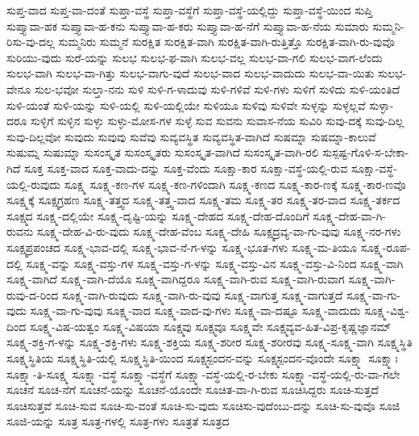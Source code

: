 {ಸುಪ್ತ-ವಾದ
ಸುಪ್ತ-ವಾ-ದಂತೆ
ಸುಪ್ತಾ-ವಸ್ಥೆ
ಸುಪ್ತಾ-ವಸ್ಥೆಗೆ
ಸುಪ್ತಾ-ವಸ್ಥೆ-ಯಲ್ಲಿದ್ದು
ಸುಪ್ತಾ-ವಸ್ಥೆ-ಯಿಂದ
ಸುಪ್ತಿ
ಸುಪ್ತ್ಯಾವಾ-ಹಕ
ಸುಪ್ತ್ಯಾವಾ-ಹ-ಕನು
ಸುಪ್ತ್ಯಾವಾ-ಹ-ಕರು
ಸುಪ್ತ್ಯಾವಾ-ಹ-ನೆಗೆ
ಸುಪ್ತ್ಯಾವಾ-ಹ-ನೆಯ
ಸುಮಾರು
ಸುಮ್ಮನಿ-ರಿಸು-ವು-ದಲ್ಲ
ಸುಮ್ಮನಿರು
ಸುಮ್ಮನೆ
ಸುರಕ್ಷಿತ
ಸುರಕ್ಷಿತ-ವಾಗಿ
ಸುರಕ್ಷಿತ-ವಾಗಿ-ರುತ್ತಿತ್ತೊ
ಸುರಕ್ಷಿತ-ವಾಗಿ-ರು-ವುವೊ
ಸುರಿಯು-ವುದು
ಸುರೆ-ಯನ್ನು
ಸುಲಭ
ಸುಲಭ-ಫ-ವಾಗಿ
ಸುಲಭ-ವಲ್ಲ
ಸುಲಭ-ವಾ-ಗಲಿ
ಸುಲಭ-ವಾಗ-ಲೆಂದು
ಸುಲಭ-ವಾಗಿ
ಸುಲಭ-ವಾ-ಗಿತ್ತು
ಸುಲಭ-ವಾಗು-ವುದೆ
ಸುಲಭ-ವಾದ
ಸುಲಭ-ವಾದುದು
ಸುಲಭ-ವಾ-ಯಿತು
ಸುಲಭ-ವೇನೂ
ಸುಲ-ಭವೋ
ಸುಲ್ತಾ-ನನು
ಸುಳಿ
ಸುಳಿ-ಗ-ಳಾದುವು
ಸುಳಿ-ಗಳಿವೆ
ಸುಳಿ-ಗಳು
ಸುಳಿಗೆ
ಸುಳಿದು
ಸುಳಿ-ಯಂತಿದೆ
ಸುಳಿ-ಯಂತೆ
ಸುಳಿ-ಯನ್ನು
ಸುಳಿ-ಯಲ್ಲಿ
ಸುಳಿ-ಯಲ್ಲಿಯೇ
ಸುಳಿಯೂ
ಸುಳಿವು
ಸುಳಿವೇ
ಸುಳ್ಳನ್ನು
ಸುಳ್ಳಲ್ಲವೆ
ಸುಳ್ಳಾ-ದರೂ
ಸುಳ್ಳಿಗೆ
ಸುಳ್ಳಿನ
ಸುಳ್ಳು
ಸುಳ್ಳು-ಮೋಸ-ಗಳ
ಸುಳ್ಳೆ
ಸುವ
ಸುವನು
ಸುವಾಸ-ನೆಯ
ಸುವಿರಿ
ಸುವು-ದಕ್ಕೆ
ಸುವು-ದಿಲ್ಲ
ಸುವು-ದಿಲ್ಲವೋ
ಸುವುದು
ಸುವುವು
ಸುವೆವು
ಸುವ್ಯವಸ್ಥಿತ
ಸುವ್ಯವಸ್ಥಿತ-ವಾಗಿದೆ
ಸುಷಮ್ನಾ
ಸುಷಮ್ನಾ-ಕಾಲುವೆ
ಸುಷುಮ್ನ
ಸುಷುಮ್ನಾ
ಸುಸಂಸ್ಕೃತ
ಸುಸಂಸ್ಕೃತರು
ಸುಸಂಸ್ಕೃತ-ವಾಗಿದೆ
ಸುಸಂಸ್ಕೃತ-ವಾಗಿ-ರಲಿ
ಸುಸ್ಪಷ್ಟ-ಗೊಳಿ-ಸ-ಬೇಕಾ-ಗಿದೆ
ಸೂಕ್ತ
ಸೂಕ್ತ-ವಾದ
ಸೂಕ್ತ-ವಾದು-ದನ್ನು
ಸೂಕ್ತ-ವೆಂದು
ಸೂಕ್ಷಾ-ಕಾರ
ಸೂಕ್ಷಾ-ವಸ್ಥೆ-ಯಲ್ಲಿ-ರುವ
ಸೂಕ್ಷಾ-ವಸ್ಥೆ-ಯಲ್ಲಿ-ರುವುದು
ಸೂಕ್ಷ್ಮ
ಸೂಕ್ಷ್ಮ-ಕಣ-ಗಳ
ಸೂಕ್ಷ್ಮ-ಕಣ-ಗಳಿಂದಾಗಿ
ಸೂಕ್ಷ್ಮ-ಕಣದ
ಸೂಕ್ಷ್ಮ-ಕಾರ-ಣಕ್ಕೆ
ಸೂಕ್ಷ್ಮ-ಕಾರ-ಣವೊ
ಸೂಕ್ಷ್ಮಕ್ಕೆ
ಸೂಕ್ಷ್ಮಗ್ರಹಣ
ಸೂಕ್ಷ್ಮ-ತತ್ತ್ವದ
ಸೂಕ್ಷ್ಮ-ತತ್ತ್ವ-ವಾದ
ಸೂಕ್ಷ್ಮ-ತಮ
ಸೂಕ್ಷ್ಮ-ತರ
ಸೂಕ್ಷ್ಮ-ತರ-ವಾದ
ಸೂಕ್ಷ್ಮ-ತರ್ಕದ
ಸೂಕ್ಷ್ಮದ
ಸೂಕ್ಷ್ಮ-ದಲ್ಲಿಯೇ
ಸೂಕ್ಷ್ಮ-ದೃಷ್ಟಿ-ಯನ್ನು
ಸೂಕ್ಷ್ಮ-ದೇಹದ
ಸೂಕ್ಷ್ಮ-ದೇಹ-ದೊಂದಿಗೆ
ಸೂಕ್ಷ್ಮ-ದೇಹ-ವಾ-ಗಿ-ರುವನು
ಸೂಕ್ಷ್ಮ-ದೇಹ-ವಿ-ರು-ವುದು
ಸೂಕ್ಷ್ಮ-ದೇಹ-ವೆಂಬ
ಸೂಕ್ಷ್ಮ-ದೇಹಿ
ಸೂಕ್ಷ್ಮದ್ರವ್ಯ-ವಾ-ಗು-ವುವು
ಸೂಕ್ಷ್ಮ-ನರ-ಗಳು
ಸೂಕ್ಷ್ಮಪ್ರಪಂಚದ
ಸೂಕ್ಷ್ಮ-ಭಾವ-ದಲ್ಲಿ
ಸೂಕ್ಷ್ಮ-ಭಾವ-ನೆ-ಗ-ಳನ್ನು
ಸೂಕ್ಷ್ಮ-ಭೂತ-ಗಳು
ಸೂಕ್ಷ್ಮ-ಮ-ತಿಯೂ
ಸೂಕ್ಷ್ಮ-ರೂಪ-ದಲ್ಲಿ
ಸೂಕ್ಷ್ಮ-ವನ್ನು
ಸೂಕ್ಷ್ಮ-ವಸ್ತು-ಗಳ
ಸೂಕ್ಷ್ಮ-ವಸ್ತು-ಗ-ಳನ್ನು
ಸೂಕ್ಷ್ಮ-ವಸ್ತು-ವಿನ
ಸೂಕ್ಷ್ಮ-ವಸ್ತು-ವಿ-ನಿಂದ
ಸೂಕ್ಷ್ಮ-ವಾಗಿ
ಸೂಕ್ಷ್ಮ-ವಾಗಿದೆ
ಸೂಕ್ಷ್ಮ-ವಾಗಿ-ದೆಯೊ
ಸೂಕ್ಷ್ಮ-ವಾಗಿದ್ದರೂ
ಸೂಕ್ಷ್ಮ-ವಾಗಿ-ರುವ
ಸೂಕ್ಷ್ಮ-ವಾಗಿ-ರುವಾಗ
ಸೂಕ್ಷ್ಮ-ವಾಗಿ-ರುವು-ದ-ರಿಂದ
ಸೂಕ್ಷ್ಮ-ವಾಗಿ-ರುವುದು
ಸೂಕ್ಷ್ಮ-ವಾಗಿ-ರು-ವುವು
ಸೂಕ್ಷ್ಮ-ವಾಗುತ್ತ
ಸೂಕ್ಷ್ಮ-ವಾಗುತ್ತದೆ
ಸೂಕ್ಷ್ಮ-ವಾ-ಗು-ವುದು
ಸೂಕ್ಷ್ಮ-ವಾ-ಗು-ವುವು
ಸೂಕ್ಷ್ಮ-ವಾದ
ಸೂಕ್ಷ್ಮ-ವಾದ-ವು-ಗಳು
ಸೂಕ್ಷ್ಮ-ವಾ-ದಷ್ಟೂ
ಸೂಕ್ಷ್ಮ-ವಾದುದು
ಸೂಕ್ಷ್ಮ-ವಿಶ್ವ-ದಿಂದ
ಸೂಕ್ಷ್ಮ-ವಿಷ-ಯತ್ವಂ
ಸೂಕ್ಷ್ಮ-ವಿಷಯಾ
ಸೂಕ್ಷ್ಮವು
ಸೂಕ್ಷ್ಮವೂ
ಸೂಕ್ಷ್ಮವೇ
ಸೂಕ್ಷ್ಮವ್ಯವ-ಹಿತ-ವಿಪ್ರ-ಕೃಷ್ಣಜ್ಞಾನಮ್
ಸೂಕ್ಷ್ಮ-ಶಕ್ತಿ-ಗ-ಳನ್ನು
ಸೂಕ್ಷ್ಮ-ಶಕ್ತಿ-ಗಳು
ಸೂಕ್ಷ್ಮ-ಶಕ್ತಿಯ
ಸೂಕ್ಷ್ಮ-ಶರೀರ
ಸೂಕ್ಷ್ಮ-ಶರೀರವು
ಸೂಕ್ಷ್ಮ-ಸೂಕ್ಷ್ಮ-ವಾಗಿ
ಸೂಕ್ಷ್ಮಸ್ಥಿತಿ
ಸೂಕ್ಷ್ಮಸ್ಥಿತಿಯ
ಸೂಕ್ಷ್ಮಸ್ಥಿತಿ-ಯಲ್ಲಿ
ಸೂಕ್ಷ್ಮಸ್ಥಿತಿ-ಯಿಂದ
ಸೂಕ್ಷ್ಮಸ್ಪಂದನ-ವನ್ನು
ಸೂಕ್ಷ್ಮಸ್ಪಂದನ-ವೊಂದೇ
ಸೂಕ್ಷ್ಮಾ
ಸೂಕ್ಷ್ಮಾಃ
ಸೂಕ್ಷ್ಮಾ-ತಿ-ಸೂಕ್ಷ್ಮ
ಸೂಕ್ಷ್ಮಾ-ವಸ್ಥೆ
ಸೂಕ್ಷ್ಮಾ-ವಸ್ಥೆಗೆ
ಸೂಕ್ಷ್ಮಾ-ವಸ್ಥೆ-ಯಲ್ಲಿ-ರ-ಬೇಕು
ಸೂಕ್ಷ್ಮಾ-ವಸ್ಥೆ-ಯಲ್ಲಿ-ರು-ವಾ-ಗಲೇ
ಸೂಚನೆ
ಸೂಚ-ನೆಗೆ
ಸೂಚನೆ-ಯನ್ನು
ಸೂಚನೆ-ಯೊಂದೇ
ಸೂಚಿತ-ವಾ-ಗಿ-ರುವ
ಸೂಚಿಸಿದ್ದರು
ಸೂಚಿ-ಸುತ್ತದೆ
ಸೂಚಿಸುತ್ತವೆ
ಸೂಚಿ-ಸುವ
ಸೂಚಿ-ಸು-ವಂತೆ
ಸೂಚಿ-ಸು-ವುದು
ಸೂಚಿಸು-ವುದೆಂಬು-ದನ್ನು
ಸೂಚಿ-ಸು-ವುವೊ
ಸೂಜಿ
ಸೂಜಿ-ಯನ್ನು
ಸೂತ್ರ
ಸೂತ್ರ-ಗಳಲ್ಲಿ
ಸೂತ್ರ-ಗಳು
ಸೂತ್ರತೆ
ಸೂತ್ರದ
}
